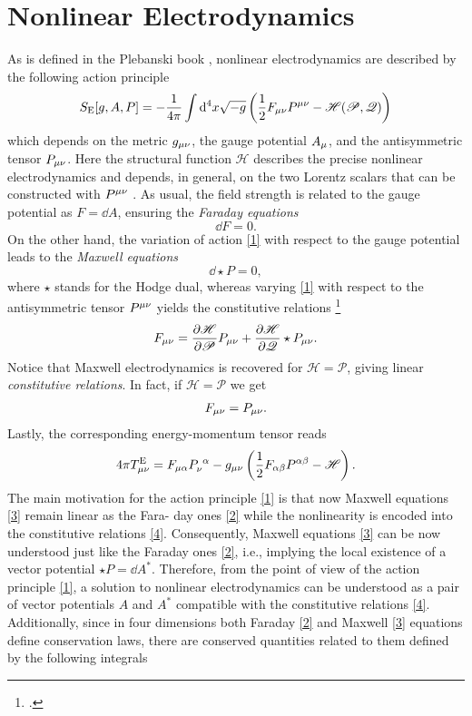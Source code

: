\section{Nonlinear Electrodynamics}
As is defined in the Plebanski book \cite{Plebanski:1970zz}, nonlinear electrodynamics are described by the following action principle
\begin{equation}\label{1}
  S_{\rm E}[g,A,P]=-\frac{1}{4\pi }\int\dd^4 x\sqrt{-g}\left(\frac{1}{2}F_{\mu\nu }P^{\mu\nu }-\mathscr{H}(\mathscr{P},\mathscr{Q})\right)
\end{equation}
which depends on the metric $g_{\mu\nu }$, the gauge potential $A_\mu$, and the antisymmetric tensor $P_{\mu\nu }$. Here the structural function $\mathscr{H}$ describes the precise nonlinear electrodynamics and depends, in general, on the two Lorentz scalars that can be constructed with $P^{\mu\nu }$ \cite{Born:1934gh}. As usual, the field strength is related to the gauge potential as $F=\dd A$, ensuring the \textit{Faraday equations}
\begin{equation}\label{2}
  \dd F=0.
\end{equation}
On the other hand, the variation of action \eqref{1} with respect to the gauge potential leads to the \textit{Maxwell equations}
\begin{equation}\label{3}
	\dd \star P=0, 
\end{equation}
where $\star$ stands for the Hodge dual, whereas varying \eqref{1} with respect to the antisymmetric tensor $P^{\mu\nu }$ yields the constitutive relations \footnote{.}
\begin{equation}\label{4}
  F_{\mu\nu }=\pdv{\mathscr{H}}{\mathscr{P}}P_{\mu\nu }+\pdv{\mathscr{H}}{\mathscr{Q}}\star P_{\mu\nu }.
\end{equation}
Notice that Maxwell electrodynamics is recovered for $\mathscr{H}=\mathscr{P}$, giving linear \textit{constitutive relations}. In fact, if $\mathscr{H}=\mathscr{P}$ we get
\begin{align}
  F_{\mu\nu }=P_{\mu\nu }.
\end{align}
Lastly, the corresponding energy-momentum tensor reads
\begin{equation}\label{5}
  4\pi T_{\mu\nu }^{\rm E}=F_{\mu\alpha }P_{\nu }^{~\alpha }-g_{\mu\nu }\left(\frac{1}{2}F_{\alpha\beta }P^{\alpha\beta }-\mathscr{H}\right). 
\end{equation}
The main motivation for the action principle \eqref{1} is that now Maxwell equations \eqref{3} remain linear as the Fara- day ones \eqref{2} while the nonlinearity is encoded into the constitutive relations \eqref{4}. Consequently, Maxwell equations \eqref{3} can be now understood just like the Faraday ones \eqref{2}, i.e., implying the local existence of a vector potential $\star P=\dd A^*$. Therefore, from the point of view of the action principle \eqref{1}, a solution to nonlinear electrodynamics can be understood as a pair of vector potentials $A$ and $A^*$ compatible with the constitutive relations \eqref{4}. Additionally, since in four dimensions both Faraday \eqref{2} and Maxwell \eqref{3} equations define conservation laws, there are conserved quantities related to them defined by the following integrals
